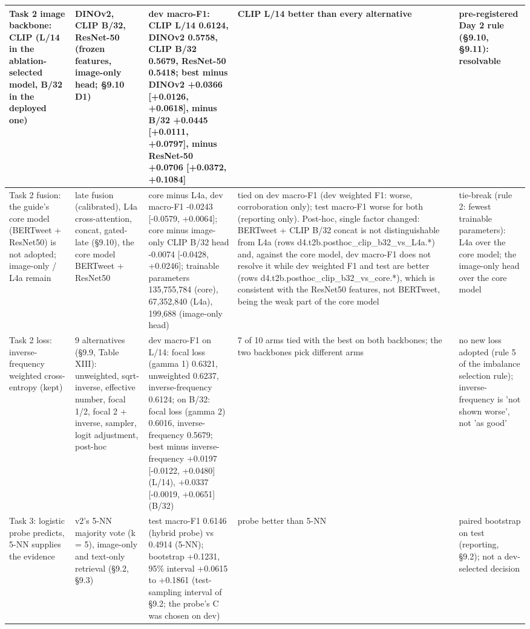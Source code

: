 \begin{table}[t]
\begin{tabular}{p{2.6cm}p{3.0cm}p{5.4cm}p{3.2cm}p{2.8cm}}
\midrule
Task 2 image backbone: CLIP (L/14 in the ablation-selected model, B/32 in the deployed one) & DINOv2, CLIP B/32, ResNet-50 (frozen features, image-only head; §9.10 D1) & dev macro-F1: CLIP L/14 0.6124, DINOv2 0.5758, CLIP B/32 0.5679, ResNet-50 0.5418; best minus DINOv2 +0.0366 [+0.0126, +0.0618], minus B/32 +0.0445 [+0.0111, +0.0797], minus ResNet-50 +0.0706 [+0.0372, +0.1084] & CLIP L/14 better than every alternative & pre-registered Day 2 rule (§9.10, §9.11): resolvable \\
\midrule
Task 2 fusion: the guide's core model (BERTweet + ResNet50) is not adopted; image-only / L4a remain & late fusion (calibrated), L4a cross-attention, concat, gated-late (§9.10), the core model BERTweet + ResNet50 & core minus L4a, dev macro-F1 -0.0243 [-0.0579, +0.0064]; core minus image-only CLIP B/32 head -0.0074 [-0.0428, +0.0246]; trainable parameters 135,755,784 (core), 67,352,840 (L4a), 199,688 (image-only head) & tied on dev macro-F1 (dev weighted F1: worse, corroboration only); test macro-F1 worse for both (reporting only). Post-hoc, single factor changed: BERTweet + CLIP B/32 concat is not distinguishable from L4a (rows d4.t2b.posthoc\_clip\_b32\_vs\_L4a.*) and, against the core model, dev macro-F1 does not resolve it while dev weighted F1 and test are better (rows d4.t2b.posthoc\_clip\_b32\_vs\_core.*), which is consistent with the ResNet50 features, not BERTweet, being the weak part of the core model & tie-break (rule 2: fewest trainable parameters): L4a over the core model; the image-only head over the core model \\
\midrule
Task 2 loss: inverse-frequency weighted cross-entropy (kept) & 9 alternatives (§9.9, Table XIII): unweighted, sqrt-inverse, effective number, focal 1/2, focal 2 + inverse, sampler, logit adjustment, post-hoc & dev macro-F1 on L/14: focal loss (gamma 1) 0.6321, unweighted 0.6237, inverse-frequency 0.6124; on B/32: focal loss (gamma 2) 0.6016, inverse-frequency 0.5679; best minus inverse-frequency +0.0197 [-0.0122, +0.0480] (L/14), +0.0337 [-0.0019, +0.0651] (B/32) & 7 of 10 arms tied with the best on both backbones; the two backbones pick different arms & no new loss adopted (rule 5 of the imbalance selection rule); inverse-frequency is 'not shown worse', not 'as good' \\
\midrule
Task 3: logistic probe predicts, 5-NN supplies the evidence & v2's 5-NN majority vote (k = 5), image-only and text-only retrieval (§9.2, §9.3) & test macro-F1 0.6146 (hybrid probe) vs 0.4914 (5-NN); bootstrap +0.1231, 95\% interval +0.0615 to +0.1861 (test-sampling interval of §9.2; the probe's C was chosen on dev) & probe better than 5-NN & paired bootstrap on test (reporting, §9.2); not a dev-selected decision \\
\midrule
\bottomrule
\end{tabular}
\end{table}
